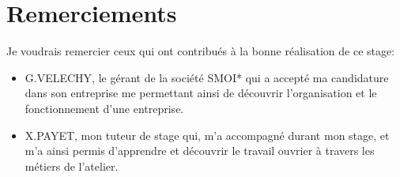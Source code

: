 \newpage
{}
\thispagestyle{empty} %
\section*{Remerciements}
Je voudrais remercier ceux qui ont contribués à la bonne réalisation de ce stage: \newline
\begin{itemize}[label=$\bullet$] %
    \item G.VELECHY, le gérant de la société \acrshort{SMOI}* qui a accepté ma candidature dans son entreprise me permettant ainsi de découvrir l'organisation et le fonctionnement d'une entreprise.
    \item X.PAYET, mon tuteur de stage qui, m'a accompagné durant mon stage, et m'a ainsi permis d'apprendre et découvrir le travail ouvrier à travers les métiers de l'atelier.
\end{itemize}
